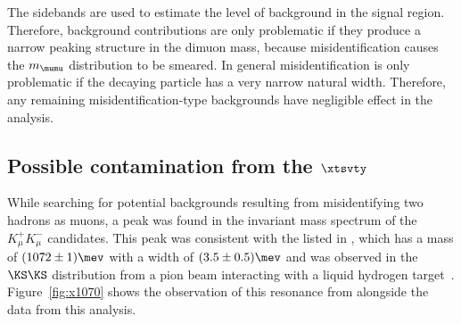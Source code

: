 

The sidebands are used to estimate the level of background in the signal region.
Therefore, background
contributions are only problematic if they produce a narrow peaking structure in the dimuon mass,
because misidentification causes the $m_{\mumu}$ distribution to be smeared.
In general misidentification is only problematic if the decaying particle has a very narrow natural
width.
Therefore, any remaining misidentification-type backgrounds have negligible effect in the analysis.


\subsection[Possible contamination from the \xtsvty]
{Possible contamination from the $\boldsymbol{\xtsvty}$}
\label{sec:x1070}
While searching for potential backgrounds resulting from misidentifying two hadrons as muons, a
peak was found in the invariant mass spectrum of the $K_\mu^+K_\mu^-$ candidates.
This peak was consistent with the \xtsvty listed in , which has a mass of
$(1072\pm1)\mev$ with a width of $(3.5\pm0.5)\mev$ and was observed in the $\KS\KS$ distribution
from a pion beam interacting with a liquid hydrogen target~\cite{x1070vlad}.
Figure~\ref{fig:x1070} shows the observation of this resonance from  alongside
the data from this analysis.

